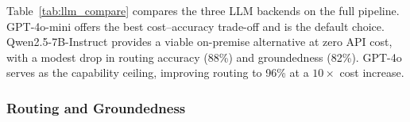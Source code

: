 \documentclass[10pt, a4paper, twocolumn]{article}
\begin{document}
Table~\ref{tab:llm_compare} compares the three LLM backends on the full pipeline.
GPT-4o-mini offers the best cost--accuracy trade-off and is the default choice.
Qwen2.5-7B-Instruct provides a viable on-premise alternative at zero API cost, with a modest drop in routing accuracy (88\%) and groundedness (82\%).
GPT-4o serves as the capability ceiling, improving routing to 96\% at a $10\times$ cost increase.

\begin{table}[h]
    \centering
    \caption{LLM backend comparison on the full pipeline (50 queries). Cost is estimated USD per query at standard API pricing.}
    \label{tab:llm_compare}
    \small
\end{table}

\subsubsection{Routing and Groundedness}

\begin{table}[t]
    \centering
    \caption{Intent routing accuracy and answer groundedness (\%) across evaluation categories.}
    \label{tab:accuracy}
    \small
\end{table}
\end{document}
